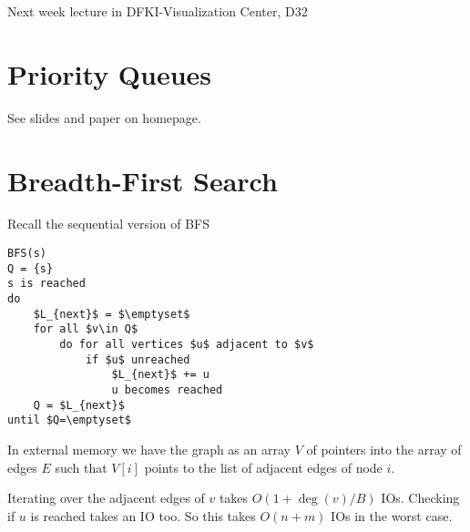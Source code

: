 Next week lecture in DFKI-Visualization Center, D32

\section{Priority Queues}

See slides and paper on homepage.

\section{Breadth-First Search}

Recall the sequential version of BFS

\begin{lstlisting}
BFS(s)
Q = {s}
s is reached
do 
	$L_{next}$ = $\emptyset$
	for all $v\in Q$
		do for all vertices $u$ adjacent to $v$
			if $u$ unreached
				$L_{next}$ += u
				u becomes reached
	Q = $L_{next}$
until $Q=\emptyset$
\end{lstlisting}

In external memory we have the graph as an array $V$ of pointers into the array of edges $E$ such that $V[i]$ points to the list of adjacent edges of node $i$.

Iterating over the adjacent edges of $v$ takes $O(1+\deg(v)/B)$ IOs. Checking if $u$ is reached takes an IO too. So this takes $O(n+m)$ IOs in the worst case.